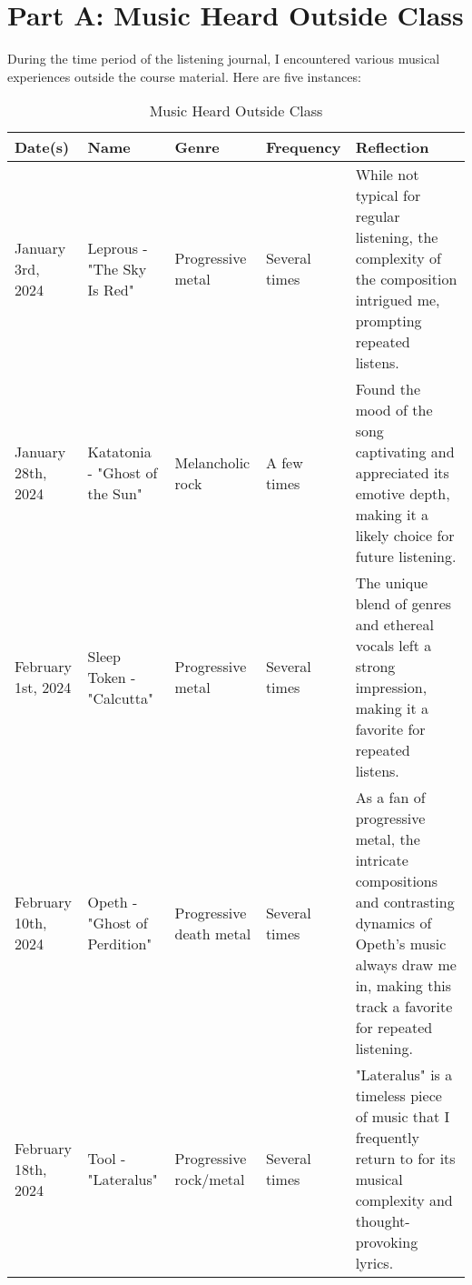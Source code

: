 
\section{Part A: Music Heard Outside Class}
\small
During the time period of the listening journal, I encountered various musical experiences outside the course material. Here are five instances:

{\setlength{\extrarowheight}{2pt}
\begin{table}[!htbp]
   \small
   \centering
   \begin{tabular}{@{}>{\raggedright\arraybackslash}p{2cm} >{\raggedright\arraybackslash}p{3.5cm} >{\raggedright\arraybackslash}p{3cm} >{\raggedright\arraybackslash}p{2cm} >{\raggedright\arraybackslash}p{4cm}@{}}
      \toprule
      \textbf{Date(s)}    & \textbf{Name}                  & \textbf{Genre}          & \textbf{Frequency} & \textbf{Reflection}                                                                                                                                                         \\
      \midrule
      January 3rd, 2024   & Leprous - "The Sky Is Red"     & Progressive metal       & Several times      & While not typical for regular listening, the complexity of the composition intrigued me, prompting repeated listens.                                                        \\
      \midrule
      January 28th, 2024  & Katatonia - "Ghost of the Sun" & Melancholic rock        & A few times        & Found the mood of the song captivating and appreciated its emotive depth, making it a likely choice for future listening.                                                   \\
      \midrule
      February 1st, 2024  & Sleep Token - "Calcutta"       & Progressive metal       & Several times      & The unique blend of genres and ethereal vocals left a strong impression, making it a favorite for repeated listens.                                                         \\
      \midrule
      February 10th, 2024 & Opeth - "Ghost of Perdition"   & Progressive death metal & Several times      & As a fan of progressive metal, the intricate compositions and contrasting dynamics of Opeth's music always draw me in, making this track a favorite for repeated listening. \\
      \midrule
      February 18th, 2024 & Tool - "Lateralus"             & Progressive rock/metal  & Several times      & "Lateralus" is a timeless piece of music that I frequently return to for its musical complexity and thought-provoking lyrics.                                               \\
      \bottomrule
   \end{tabular}
   \caption{Music Heard Outside Class}
\end{table}
}